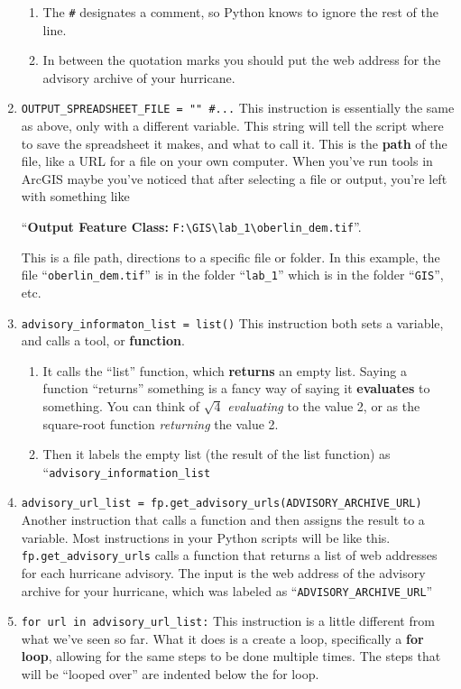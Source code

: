 \documentclass{article}
\begin{document}
\begin{enumerate}
\begin{enumerate}
        \item The \verb+#+ designates a comment, so Python knows to ignore the rest of the line.  
        \item In between the quotation marks you should put the web address for the advisory archive of your hurricane.  
    \end{enumerate}
\item \verb+OUTPUT_SPREADSHEET_FILE = "" #...+ This instruction is essentially the same as above, only with a different variable.  This string will tell the script where to save the spreadsheet it makes, and what to call it.  This is the \textbf{path} of the file, like a URL for a file on your own computer.  When you've run tools in ArcGIS maybe you've noticed that after selecting a file or output, you're left with something like 
    
    ``\textbf{Output Feature Class:} \verb+F:\GIS\lab_1\oberlin_dem.tif+''.  
    
    This is a file path, directions to a specific file or folder.  In this example, the file ``\verb+oberlin_dem.tif+'' is in the folder ``\verb+lab_1+'' which is in the folder ``\verb+GIS+'', etc.  
    \item \verb+advisory_informaton_list = list()+ This instruction both sets a variable, and calls a tool, or \textbf{function}.
    \begin{enumerate}
        \item It calls the ``list'' function, which \textbf{returns} an empty list. Saying a function ``returns'' something is a fancy way of saying it \textbf{evaluates} to something.  You can think of $\sqrt{4}$ \textit{evaluating} to the value 2, or as the square-root function \textit{returning} the value 2.
        \item Then it labels the empty list (the result of the list function) as ``\verb+advisory_information_list+
    \end{enumerate}
    \item \verb+advisory_url_list = fp.get_advisory_urls(ADVISORY_ARCHIVE_URL)+  Another instruction that calls a function and then assigns the result to a variable.  Most instructions in your Python scripts will be like this.  \verb+fp.get_advisory_urls+ calls a function that returns a list of web addresses for each hurricane advisory.  The input is the web address of the advisory archive for your hurricane, which was labeled as ``\verb+ADVISORY_ARCHIVE_URL+''
        \item \verb+for url in advisory_url_list:+  This instruction is a little different from what we've seen so far.  What it does is a create a loop, specifically a \textbf{for loop}, allowing for the same steps to be done multiple times.  The steps that will be ``looped over'' are indented below the for loop.


\end{enumerate}
\end{document}
